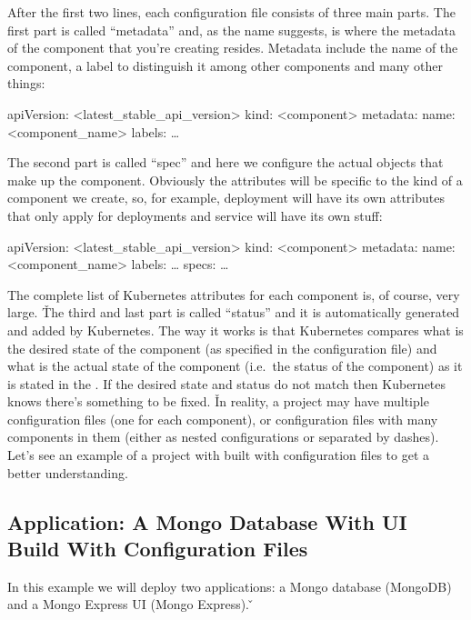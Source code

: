 After the first two lines, each configuration file consists of three main parts. The first part is called
``metadata'' and, as the name suggests, is where the metadata of the component that you're creating resides. Metadata
include the name of the component, a label to distinguish it among other components and many other things:

\begin{block}
apiVersion: <latest_stable_api_version>
kind: <component>
metadata:
   name: <component_name>
   labels: \dots
\end{block}

The second part is called ``spec'' and here we configure the actual objects that make up the component. Obviously the
attributes will be specific to the kind of a component we create, so, for example, deployment will have its own
attributes that only apply for deployments and service will have its own stuff:

\begin{block}
apiVersion: <latest_stable_api_version>
kind: <component>
metadata:
   name: <component_name>
   labels: \dots
specs:
    \dots
\end{block}

The complete list of Kubernetes attributes for each component is, of course, very large. \v

The third and last part is called ``status'' and it is automatically generated and added by Kubernetes. The way it
works is that Kubernetes compares what is the desired state of the component (as specified in the configuration file)
and what is the actual state of the component (i.e.\ the status of the component) as it is stated in the .
If the desired state and status do not match then Kubernetes knows there's something to be fixed. \v

In reality, a project may have multiple configuration files (one for each component), or configuration files with
many components in them (either as nested configurations or separated by dashes). Let's see an example of a project
with built with configuration files to get a better understanding.

\subsection*{Application: A Mongo Database With UI Build With Configuration Files}

In this example we will deploy two applications: a Mongo database (MongoDB) and a Mongo Express UI (Mongo Express). \v

